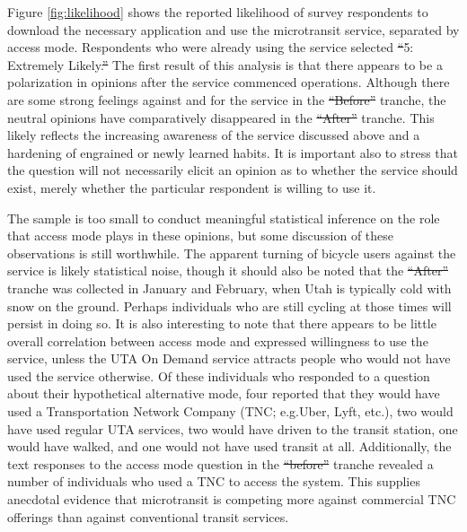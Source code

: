 \documentclass[smartcities,article,submit,moreauthors,pdftex]{mdpi} %
\providecommand{\DIFadd}[1]{{\protect\color{blue}\uwave{#1}}} %
\providecommand{\DIFdel}[1]{{\protect\color{red}\sout{#1}}}                      %
\providecommand{\DIFaddbegin}{} %
\providecommand{\DIFaddend}{} %
\providecommand{\DIFdelbegin}{} %
\providecommand{\DIFdelend}{} %
\begin{document}
Figure \ref{fig:likelihood} shows the reported likelihood of survey respondents
to download the necessary application and use the microtransit service,
separated by access mode. Respondents who were already using the service
selected \DIFdelbegin \DIFdel{“}\DIFdelend \DIFaddbegin \DIFadd{``}\DIFaddend 5: Extremely Likely.\DIFdelbegin \DIFdel{” }\DIFdelend \DIFaddbegin \DIFadd{'' }\DIFaddend The first result of this analysis is that there
appears to be a polarization in opinions after the service commenced operations.
Although there are some strong feelings against and for the service in the
\DIFdelbegin \DIFdel{“Before” }\DIFdelend \DIFaddbegin \DIFadd{``Before'' }\DIFaddend tranche, the neutral opinions have comparatively disappeared in the
\DIFdelbegin \DIFdel{“After” }\DIFdelend \DIFaddbegin \DIFadd{``After'' }\DIFaddend tranche. This likely reflects the increasing awareness of the service
discussed above and a hardening of engrained or newly learned habits. It is
important also to stress that the question will not necessarily elicit an
opinion as to whether the service should exist, merely whether the particular
respondent is willing to use it.

The sample is too small to conduct meaningful statistical inference on the role
that access mode plays in these opinions, but some discussion of these
observations is still worthwhile. The apparent turning of bicycle users against
the service is likely statistical noise, though it should also be noted that the
\DIFdelbegin \DIFdel{“After” }\DIFdelend \DIFaddbegin \DIFadd{``After'' }\DIFaddend tranche was collected in January and February, when Utah is typically
cold with snow on the ground. Perhaps individuals who are still cycling at those
times will persist in doing so. It is also interesting to note that there
appears to be little overall correlation between access mode and expressed
willingness to use the service, unless the UTA On Demand service attracts people
who would not have used the service otherwise. Of these individuals who
responded to a question about their hypothetical alternative mode, four reported
that they would have used a Transportation Network Company (TNC; e.g.\DIFaddbegin \DIFadd{~}\DIFaddend Uber,
Lyft, etc.), two would have used regular UTA services, two would have driven to
the transit station, one would have walked, and one would not have used transit
at all. Additionally, the text responses to the access mode question in the
\DIFdelbegin \DIFdel{“before” }\DIFdelend \DIFaddbegin \DIFadd{``before'' }\DIFaddend tranche revealed a number of individuals who used a TNC to access the
system. This supplies anecdotal evidence that microtransit is competing more
against commercial TNC offerings than against conventional transit services.
\end{document}

